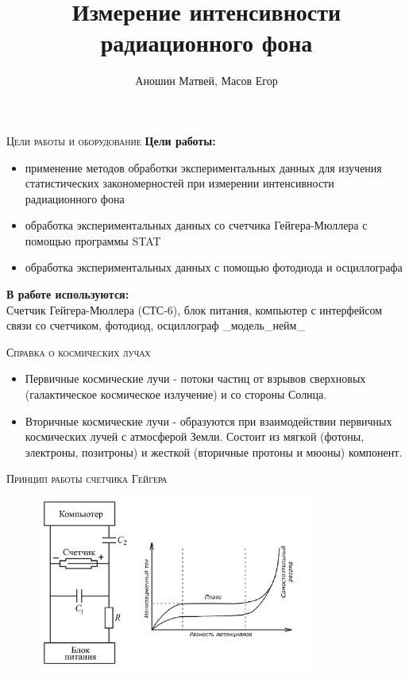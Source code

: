 \documentclass{beamer}%
\title{Измерение интенсивности радиационного фона}
\author{Аношин Матвей, Масов Егор}
\begin{document}
\begin{frame}
    \titlepage
\end{frame}

\begin{frame}{\textsc{Цели работы и оборудование}}
    \large{\textbf{Цели работы:}}
    \begin{itemize}
        \item \normalsize{применение методов обработки экспериментальных данных для изучения статистических закономерностей при измерении интенсивности радиационного фона}
        \item {обработка экспериментальных данных со счетчика Гейгера-Мюллера с помощью программы STAT}
        \item {обработка экспериментальных данных с помощью фотодиода и осциллографа}
    \end{itemize}
    \vspace{15}
    \large{\textbf{В работе используются:}}\\
    \normalsize{Счетчик Гейгера-Мюллера (СТС-6), блок питания, компьютер с интерфейсом связи со счетчиком, фотодиод, осциллограф _модель_нейм_}
\end{frame}

\begin{frame}{\textsc{Справка о космических лучах}}
    \begin{itemize}
        \item Первичные космические лучи - потоки частиц от взрывов сверхновых (галактическое космическое излучение) и со стороны Солнца.
        \item Вторичные космические лучи - образуются при взаимодействии первичных космических лучей с атмосферой Земли. Состоит из мягкой (фотоны, электроны, позитроны) и жесткой (вторичные протоны и мюоны) компонент.
    \end{itemize}
\end{frame}
    
\begin{frame}{\textsc{Принцип работы счетчика Гейгера}}
    \begin{figure}[t]
            \includegraphics[width=1.1\linewidth, height=220.0]{images/Geiger counter.png}
    \end{figure}
\end{frame}
\end{document}
